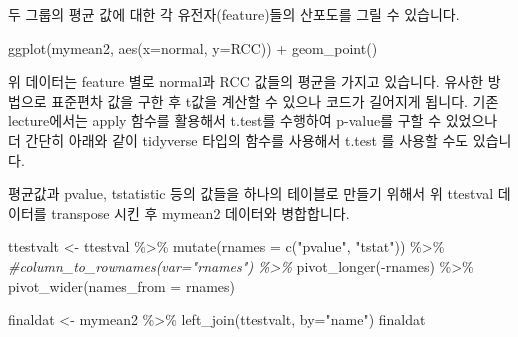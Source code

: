 \documentclass[
]{book}
\newenvironment{Shaded}{\begin{snugshade}}{\end{snugshade}}
\newcommand{\AttributeTok}[1]{\textcolor[rgb]{0.77,0.63,0.00}{#1}}
\newcommand{\CommentTok}[1]{\textcolor[rgb]{0.56,0.35,0.01}{\textit{#1}}}
\newcommand{\ControlFlowTok}[1]{\textcolor[rgb]{0.13,0.29,0.53}{\textbf{#1}}}
\newcommand{\FunctionTok}[1]{\textcolor[rgb]{0.00,0.00,0.00}{#1}}
\newcommand{\NormalTok}[1]{#1}
\newcommand{\OtherTok}[1]{\textcolor[rgb]{0.56,0.35,0.01}{#1}}
\newcommand{\SpecialCharTok}[1]{\textcolor[rgb]{0.00,0.00,0.00}{#1}}
\newcommand{\StringTok}[1]{\textcolor[rgb]{0.31,0.60,0.02}{#1}}
\begin{document}
두 그룹의 평균 값에 대한 각 유전자(feature)들의 산포도를 그릴 수 있습니다.

\begin{Shaded}
\begin{Highlighting}[]
\FunctionTok{ggplot}\NormalTok{(mymean2, }\FunctionTok{aes}\NormalTok{(}\AttributeTok{x=}\NormalTok{normal, }\AttributeTok{y=}\NormalTok{RCC)) }\SpecialCharTok{+}
  \FunctionTok{geom\_point}\NormalTok{()}
\end{Highlighting}
\end{Shaded}

위 데이터는 feature 별로 normal과 RCC 값들의 평균을 가지고 있습니다. 유사한 방법으로 표준편차 값을 구한 후 t값을 계산할 수 있으나 코드가 길어지게 됩니다. 기존 lecture에서는 apply 함수를 활용해서 t.test를 수행하여 p-value를 구할 수 있었으나 더 간단히 아래와 같이 tidyverse 타입의 함수를 사용해서 t.test 를 사용할 수도 있습니다.

\begin{Shaded}
\end{Shaded}

평균값과 pvalue, tstatistic 등의 값들을 하나의 테이블로 만들기 위해서 위 ttestval 데이터를 transpose 시킨 후 mymean2 데이터와 병합합니다.

\begin{Shaded}
\begin{Highlighting}[]

\NormalTok{ttestvalt }\OtherTok{\textless{}{-}}\NormalTok{ ttestval }\SpecialCharTok{\%\textgreater{}\%} 
  \FunctionTok{mutate}\NormalTok{(}\AttributeTok{rnames =} \FunctionTok{c}\NormalTok{(}\StringTok{"pvalue"}\NormalTok{, }\StringTok{"tstat"}\NormalTok{)) }\SpecialCharTok{\%\textgreater{}\%} 
  \CommentTok{\#column\_to\_rownames(var="rnames") \%\textgreater{}\% }
  \FunctionTok{pivot\_longer}\NormalTok{(}\SpecialCharTok{{-}}\NormalTok{rnames) }\SpecialCharTok{\%\textgreater{}\%} 
  \FunctionTok{pivot\_wider}\NormalTok{(}\AttributeTok{names\_from =}\NormalTok{ rnames)}

\NormalTok{finaldat }\OtherTok{\textless{}{-}}\NormalTok{ mymean2 }\SpecialCharTok{\%\textgreater{}\%} \FunctionTok{left\_join}\NormalTok{(ttestvalt, }\AttributeTok{by=}\StringTok{"name"}\NormalTok{)}
\NormalTok{finaldat}
\end{Highlighting}
\end{Shaded}
\end{document}
